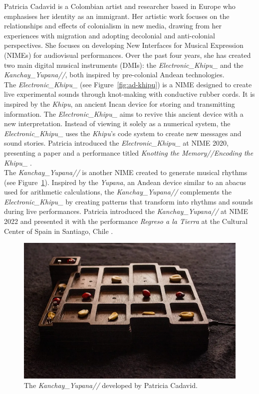 Patricia Cadavid is a Colombian artist and researcher based in Europe who emphasises her identity as an immigrant. Her artistic work focuses on the relationships and effects of colonialism in new media, drawing from her experiences with migration and adopting decolonial and anti-colonial perspectives. She focuses on developing New Interfaces for Musical Expression (NIMEs) for audiovisual performances. Over the past four years, she has created two main digital musical instruments (DMIs): the \textit{Electronic\_Khipu\_} and the \textit{Kanchay\_Yupana//}, both inspired by pre-colonial Andean technologies.\\
The \textit{Electronic\_Khipu\_} (see Figure~\ref{fig:ad-khipu}) is a NIME designed to create live experimental sounds through knot-making with conductive rubber cords. It is inspired by the \textit{Khipu}, an ancient Incan device for storing and transmitting information. The \textit{Electronic\_Khipu\_} aims to revive this ancient device with a new interpretation. Instead of viewing it solely as a numerical system, the \textit{Electronic\_Khipu\_} uses the \textit{Khipu}’s code system to create new messages and sound stories. Patricia introduced the \textit{Electronic\_Khipu\_} at NIME 2020, presenting a paper and a performance titled \textit{Knotting the Memory//Encoding the Khipu\_} \cite{cadavid2020knotting, hinojosa2020electronic_khipu_, cadavid2022knotting}.\\
The \textit{Kanchay\_Yupana//} is another NIME created to generate musical rhythms (see Figure~\ref{fig:ad-yupana}). Inspired by the \textit{Yupana}, an Andean device similar to an abacus used for arithmetic calculations, the \textit{Kanchay\_Yupana//} complements the \textit{Electronic\_Khipu\_} by creating patterns that transform into rhythms and sounds during live performances. Patricia introduced the \textit{Kanchay\_Yupana//} at NIME 2022 and presented it with the performance \textit{Regreso a la Tierra} at the Cultural Center of Spain in Santiago, Chile \cite{hinojosa2022kanchay_yupana, cadavid2022knotting}.\\

\begin{figure}[!h]
    \centering
    \includegraphics[width=\linewidth]{chapters/appendix/d/image/figd-yupana.png}
    \caption{The \textit{Kanchay\_Yupana//} developed by Patricia Cadavid.}
    \label{fig:ad-yupana}
\end{figure}


